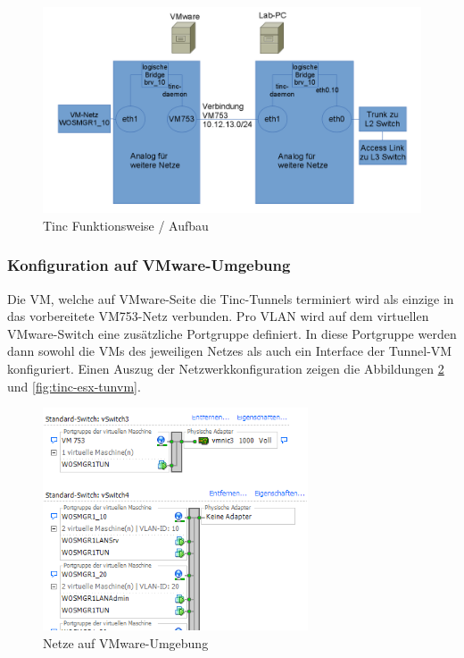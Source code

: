 \begin{figure}[H]
\centering
\includegraphics[width=1.0\textwidth]{Phase2/tinc_netz.png}
\caption{Tinc Funktionsweise / Aufbau}
\label{fig:tinc}
\end{figure}

\subsubsection{Konfiguration auf VMware-Umgebung}
Die VM, welche auf VMware-Seite die Tinc-Tunnels terminiert wird als einzige in das vorbereitete VM753-Netz verbunden. Pro VLAN wird auf dem virtuellen VMware-Switch eine zusätzliche Portgruppe definiert. In diese Portgruppe werden dann sowohl die VMs des jeweiligen Netzes als auch ein Interface der Tunnel-VM konfiguriert. Einen Auszug der Netzwerkkonfiguration zeigen die Abbildungen \ref{fig:tinc-esx-overview} und \ref{fig:tinc-esx-tunvm}.

\begin{figure}[H]
\centering
\includegraphics[width=0.7\textwidth]{Phase2/tinc_esx_netz.png}
\caption{Netze auf VMware-Umgebung}
\label{fig:tinc-esx-overview}
\end{figure}


